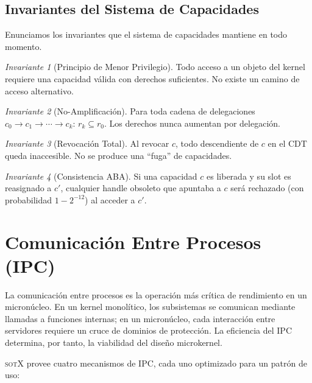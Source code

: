 \documentclass[11pt,twoside,openright]{book}
\theoremstyle{definition}
\theoremstyle{plain}
\theoremstyle{remark}
\newtheorem{invariant}{Invariante}[chapter]
\newcommand{\sotos}{\textsc{sotX}}
\begin{document}
\section{Invariantes del Sistema de Capacidades}

Enunciamos los invariantes que el sistema de capacidades mantiene en todo momento.

\begin{invariant}[Principio de Menor Privilegio]
\label{inv:least-privilege}
Todo acceso a un objeto del kernel requiere una capacidad válida con derechos suficientes.
No existe un camino de acceso alternativo.
\end{invariant}

\begin{invariant}[No-Amplificación]
\label{inv:no-amplification}
Para toda cadena de delegaciones $c_0 \to c_1 \to \cdots \to c_k$:
$r_k \subseteq r_0$. Los derechos nunca aumentan por delegación.
\end{invariant}

\begin{invariant}[Revocación Total]
\label{inv:total-revocation}
Al revocar $c$, todo descendiente de $c$ en el CDT queda inaccesible. No se produce
una ``fuga'' de capacidades.
\end{invariant}

\begin{invariant}[Consistencia ABA]
\label{inv:aba-consistency}
Si una capacidad $c$ es liberada y su slot es reasignado a $c'$, cualquier handle
obsoleto que apuntaba a $c$ será rechazado (con probabilidad $1 - 2^{-12}$) al
acceder a $c'$.
\end{invariant}


\chapter{Comunicación Entre Procesos (IPC)}
\label{chap:ipc}

La comunicación entre procesos es la operación más crítica de rendimiento en un
micronúcleo. En un kernel monolítico, los subsistemas se comunican mediante llamadas
a funciones internas; en un micronúcleo, cada interacción entre servidores requiere
un cruce de dominios de protección. La eficiencia del IPC determina, por tanto, la
viabilidad del diseño microkernel.

\sotos{} provee cuatro mecanismos de IPC, cada uno optimizado para un patrón de uso:
\end{document}
